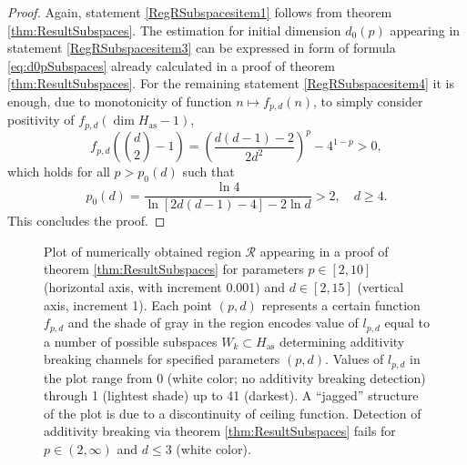 \documentclass[reqno]{amsart}
\theoremstyle{plain}
\theoremstyle{note}
\newcommand{\aspace}{H_{\mathrm{as}}}
\begin{document}
\begin{proof}
Again, statement \ref{RegRSubspacesitem1} follows from theorem \ref{thm:ResultSubspaces}. The estimation for initial dimension $d_0 (p)$ appearing in statement \ref{RegRSubspacesitem3} can be expressed in form of formula \eqref{eq:d0pSubspaces} already calculated in a proof of theorem \ref{thm:ResultSubspaces}. For the remaining statement \ref{RegRSubspacesitem4} it is enough, due to monotonicity of function $n\mapsto f_{p,d}(n)$, to simply consider positivity of $f_{p,d}(\dim{\aspace}-1)$,
\begin{equation}
    f_{p,d}\left(\binom{d}{2}-1\right) = \left(\frac{d(d-1)-2}{2d^2}\right)^p - 4^{1-p} > 0,
\end{equation}
which holds for all $p > p_0 (d)$ such that
\begin{equation}
    p_0 (d) = \frac{\ln{4}}{\ln{[2d(d-1)-4]} - 2 \ln{d}} > 2, \quad d \geqslant 4.
\end{equation}
This concludes the proof.
\end{proof}

\begin{figure}
    \centering
    \caption{Plot of numerically obtained region $\mathcal{R}$ appearing in a proof of theorem \ref{thm:ResultSubspaces} for parameters $p\in [2,10]$ (horizontal axis, with increment 0.001) and $d \in [2,15]$ (vertical axis, increment 1). Each point $(p,d)$ represents a certain function $f_{p,d}$ and the shade of gray in the region encodes value of $l_{p,d}$ equal to a number of possible subspaces $W_k \subset \aspace$ determining additivity breaking channels for specified parameters $(p,d)$. Values of $l_{p,d}$ in the plot range from 0 (white color; no additivity breaking detection) through 1 (lightest shade) up to 41 (darkest). A ``jagged'' structure of the plot is due to a discontinuity of ceiling function. Detection of additivity breaking via theorem \ref{thm:ResultSubspaces} fails for $p \in (2,\infty)$ and $d\leqslant 3$ (white color).}
    \label{fig:RegionRSubspaces}
\end{figure}
\end{document}
